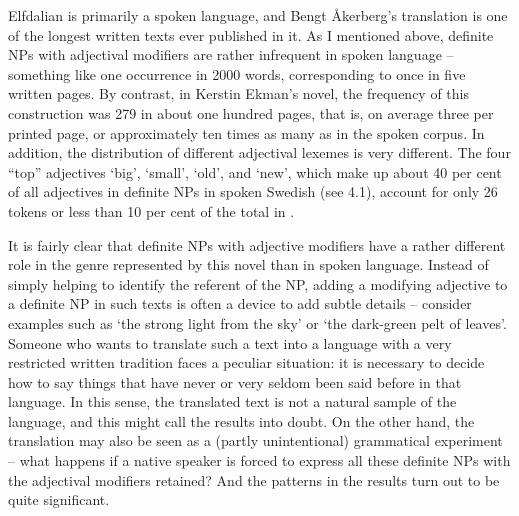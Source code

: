 
Elfdalian is primarily a spoken language, and Bengt Åkerberg’s translation is one of the longest written texts ever published in it. As I mentioned above, definite NPs with adjectival modifiers are rather infrequent in spoken language – something like one occurrence in 2000 words, corresponding to once in five written pages. By contrast, in Kerstin Ekman’s novel, the frequency of this construction was 279 in about one hundred pages, that is, on average three per printed page, or approximately ten times as many as in the spoken corpus. In addition, the distribution of different adjectival lexemes is very different. The four “top” adjectives ‘big’,  ‘small’,  ‘old’, and  ‘new’, which make up about 40 per cent of all adjectives in definite NPs in spoken Swedish (see 4.1), account for only 26 tokens or less than 10 per cent of the total in .


It is fairly clear that definite NPs with adjective modifiers have a rather different role in the genre represented by this novel than in spoken language. Instead of simply helping to identify the referent of the NP, adding a modifying adjective to a definite NP in such texts is often a device to add subtle details – consider examples such as  ‘the strong light from the sky’ or  ‘the dark-green pelt of leaves’. Someone who wants to translate such a text into a language with a very restricted written tradition faces a peculiar situation: it is necessary to decide how to say things that have never or very seldom been said before in that language. In this sense, the translated text is not a natural sample of the language, and this might call the results into doubt. On the other hand, the translation may also be seen as a (partly unintentional) grammatical experiment – what happens if a native speaker is forced to express all these definite NPs with the adjectival modifiers retained? And the patterns in the results turn out to be quite significant.

